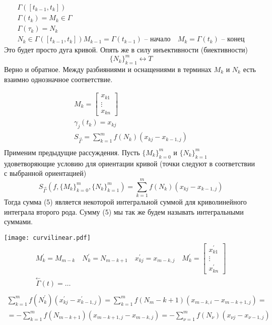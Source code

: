 \documentclass[main]{subfiles}
\begin{document}
\begin{definition}
    \begin{gather*}
        \Gamma([t_{k-1}, t_k]) \\
        \Gamma(t_k) = M_k \in \Gamma \\
        \Gamma(\tau_k) = N_k \\
        N_k \in \Gamma([t_{k-1},t_k])
        M_{k-1} = \Gamma(t_{k-1}) \text{ -- начало} \quad M_k = \Gamma(t_k) \text{ -- конец}
    \end{gather*}
    Это будет просто дуга кривой. Опять же в силу инъективности (биективности)
    \[ \{ N_k \}_{k=1}^m \leftrightarrow T \] Верно и обратное.
    Между разбияниями и оснащениями в терминах $M_k$ и $N_k$ есть взаимно однозначное соответствие.
\end{definition}

\begin{gather*}
    M_k = \begin{bmatrix*}
        x_{k1} \\
        \vdots \\
        x_{kn}
    \end{bmatrix*} \\
    \gamma_j(t_k) = x_{kj} \\
     S_{\stackrel{\rightarrow}{\Gamma}} = \sum^m_{k=1} f(N_k)(x_{kj} - x_{k-1,j}) \tag{4} \\
\end{gather*}
Применим предыдущие рассуждения. Пусть $ \{ M_k \}^m_{k=0}$ и $\{ N_k \}^m_{k=1}$ удоветворяющие условию для ориентации кривой
(точки следуют в соответствии с выбранной ориентацией)
\[  S_{\stackrel{\rightarrow}{\Gamma}} (f,\{ M_k \}^m_{k=0},\{ N_k \}^m_{k=1} ) =  \sum^m_{k=1} f(N_k)(x_{kj} - x_{k-1,j}) \tag{5} \]
Тогда сумма (5) является некоторой интегральной суммой для криволинейного интеграла второго рода.
Сумму (5) мы так же будем называть интегральными суммами.


\texttt{[image: curvilinear.pdf]}
\begin{gather*}
    M^\prime_k = M_{m-k} \quad N^\prime_k = N_{m-k+1} \quad x^\prime_{kj} = x_{m-k,j}  \quad M^\prime_k= \begin{bmatrix*}
        x^\prime_{k1} \\
        \vdots \\
        x^\prime_{kn}
    \end{bmatrix*}\\
    \stackrel{\leftarrow}{\Gamma}(t) = \ldots \\ 
\end{gather*}
\begin{multline*}
    \sum^m_{k=1} f(N^\prime_k)(x^\prime_{kj} - x^\prime_{k-1,j}) = \sum^m_{k=1}f(N_m-k+1)(x_{m-k,i} - x_{m-k+1,j}) =\\
    = - \sum^m_{k=1} f(N_{m-k+1})(x_{m-k+1,j} - x_{m-k,j}) = -\sum^m_{\nu = 1}f(N_\nu) (x_{\nu j} - x_{\nu -1,j}) \tag{6}
\end{multline*}
\end{document}
